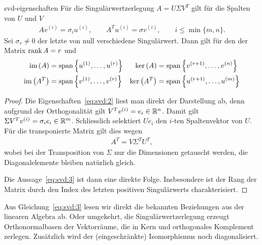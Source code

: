 \begin{Lemma}{svd-eigenschaften}
  Für die Singulärwertzerlegung $A=U\Sigma V^T$ gilt für die Spalten
  von $U$ und $V$
  \begin{gather}
    \label{eq:svd:2}
    A v^{(i)} = \sigma_i u^{(i)}, \qquad
    A^T u^{(i)} = \sigma v^{(i)},\qquad
    i \le \min\{m,n\}.
  \end{gather}
  Sei $\sigma_r\neq0$ der letzte von null verschiedene
  Singulärwert. Dann gilt für den  der Matrix $\operatorname{rank} A = r$
  und
  \begin{gather}
    \label{eq:svd:3}
    \begin{aligned}
      \operatorname{im}\left(A\right) &= \operatorname{span}\left\{u^{(1)},\dots,u^{(r)}\right\}&
      \operatorname{ker}\left(A\right) &= \operatorname{span}\left\{v^{(r+1)},\dots,v^{(n)}\right\}\\
      \operatorname{im}\left(A^T\right) &= \operatorname{span}\left\{v^{(1)},\dots,v^{(r)}\right\}&
      \operatorname{ker}\left(A^T\right) &= \operatorname{span}\left\{u^{(r+1)},\dots,u^{(m)}\right\}
    \end{aligned}
  \end{gather}
\end{Lemma}

\begin{proof}
  Die Eigenschaften~\eqref{eq:svd:2} liest man direkt der Darstellung
  ab, denn aufgrund der Orthogonalität gilt
  $V^T v^{(i)} = e_i \in \mathbb R^n$. Damit gilt
  $\Sigma V^Tv^{(i)} = \sigma_i e_i \in \mathbb R^m$. Schliesslich selektiert
  $Ue_i$ den $i$-ten Spaltenvektor von $U$. Für die transponierte
  Matrix gilt dies wegen
  \begin{gather}
    A^T = V \Sigma^T U^T,
  \end{gather}
  wobei bei der Transposition von $\Sigma$ nur die Dimensionen
  getauscht werden, die Diagonalelemente bleiben natürlich gleich.

  Die Aussage~\eqref{eq:svd:3} ist dann eine direkte
  Folge. Insbesondere ist der Rang der Matrix durch den Index des
  letzten positiven Singulärwerts charakterisiert.
\end{proof}

\begin{remark}
  Aus Gleichung~\eqref{eq:svd:3} lesen wir direkt die bekannten
  Beziehungen aus der linearen Algebra ab. Oder umgekehrt, die
  Singulärwertzerlegung erzeugt Orthonormalbasen der Vektorräume, die
  in Kern und orthogonales Komplement zerlegen. Zusätzlich wird der
  (eingeschränkte) Isomorphismus noch diagonalisiert.
\end{remark}

